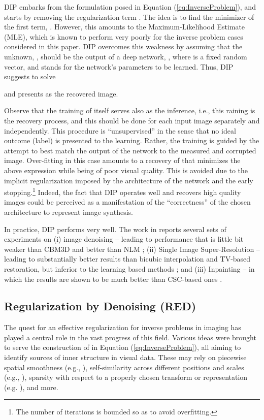 \documentclass[12pt]{article}
\begin{document}
DIP embarks from the formulation posed in Equation (\ref{eq:InverseProblem}), and starts by removing the regularization term . The idea is to find the minimizer of the first term, . However, this amounts to the  Maximum-Likelihood Estimate (MLE), which is known to perform very poorly for the inverse problem cases considered in this paper. DIP overcomes this weakness by assuming that the unknown, , should be the output of a deep network, , where  is a fixed random vector, and  stands for the network's parameters to be learned. Thus, DIP suggests to solve 

and presents  as the recovered image. 

Observe that the training of  itself serves also as the inference, i.e., this raining is the recovery process, and this should be done for each input image separately and independently. This procedure is ``unsupervised'' in the sense that no ideal outcome (label) is presented to the learning. Rather, the training is guided by the attempt to best match the output of the network to the measured and corrupted image. Over-fitting in this case amounts to a recovery of  that minimizes the above  expression while being of poor visual quality. This is avoided due to the implicit regularization imposed by the architecture of the network  and the early stopping.\footnote{The number of iterations is bounded so as to avoid overfitting.} Indeed, the fact that DIP operates well and recovers high quality images could be perceived as a manifestation of the ``correctness'' of the chosen architecture to represent  image synthesis. 

In practice, DIP performs very well. The work in \cite{DIP-2018} reports several sets of experiments on (i) image denoising -- leading to performance that is little bit weaker than CBM3D \cite{BM3D} and better than NLM \cite{NLM}; (ii) Single Image Super-Resolution -- leading to substantially better results than bicubic interpolation and TV-based restoration, but inferior to the learning based methods \cite{LapSRN,SRresnet}; and (iii) Inpainting -- in which the results are shown to be much better than CSC-based ones \cite{Papyan2017ConvolutionalDL}. 



\subsection{Regularization by Denoising (RED)}
\label{subsec:RED}

The quest for an effective regularization for inverse problems in imaging has played a central role in the vast progress of this field. Various ideas were brought to serve the construction of  in Equation (\ref{eq:InverseProblem}), all aiming to identify sources of inner structure in visual data. These may rely on piecewise spatial smoothness (e.g., \cite{rudin1992nonlinear}), self-similarity across different positions and scales (e.g., \cite{NLM,romano2014single}), 
sparsity with respect to a properly chosen transform or representation (e.g. \cite{BM3D}), and more. 
\end{document}
